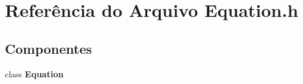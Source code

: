\section{Referência do Arquivo Equation.\+h}
\label{_equation_8h}
\subsection*{Componentes}
\begin{DoxyCompactItemize}
\item 
class {\bf Equation}
\end{DoxyCompactItemize}

